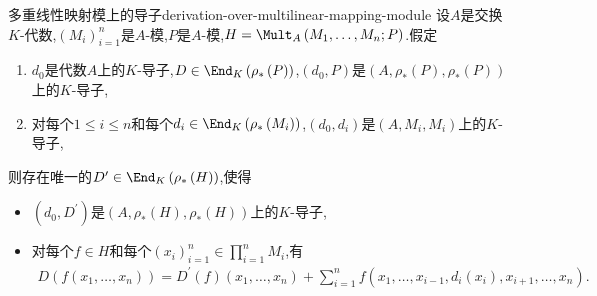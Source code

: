 \begin{proposition}{多重线性映射模上的导子}{derivation-over-multilinear-mapping-module}
	设$A$是交换$K$-代数,$\left(M_{i}\right)_{i=1}^{n}$是$A$-模,$P$是$A$-模,$H=\Mult_{A}\left(M_{1},\ldots,M_{n};P\right)$.假定
	\begin{enumerate}
		\item $d_{0}$是代数$A$上的$K$-导子,$D\in\End_{K}\left(\rho_{\ast}\left(P\right)\right)$,$\left(d_{0},P\right)$是$\left(A,\rho_{\ast}\left(P\right),\rho_{\ast}\left(P\right)\right)$上的$K$-导子,
		\item 对每个$1\leq i\leq n$和每个$d_{i}\in\End_{K}\left(\rho_{\ast}\left(M_{i}\right)\right)$,$\left(d_{0},d_{i}\right)$是$\left(A,M_{i},M_{i}\right)$上的$K$-导子,
	\end{enumerate}
	则存在唯一的$D^{\prime}\in\End_{K}\left(\rho_{\ast}\left(H\right)\right)$,使得
	\begin{itemize}
		\item $\left(d_{0},D^{\prime}\right)$是$\left(A,\rho_{\ast}\left(H\right),\rho_{\ast}\left(H\right)\right)$上的$K$-导子,
		\item 对每个$f\in H$和每个$\left(x_{i}\right)_{i=1}^{n}\in\prod\limits_{i=1}^{n}M_{i}$,有
		\begin{align*}
			D\left(f\left(x_{1},\ldots,x_{n}\right)\right)=D^{\prime}\left(f\right)\left(x_{1},\ldots,x_{n}\right)+\sum\limits_{i=1}^{n}f\left(x_{1},\ldots,x_{i-1},d_{i}\left(x_{i}\right),x_{i+1},\ldots,x_{n}\right).
		\end{align*}
	\end{itemize}
\end{proposition}

